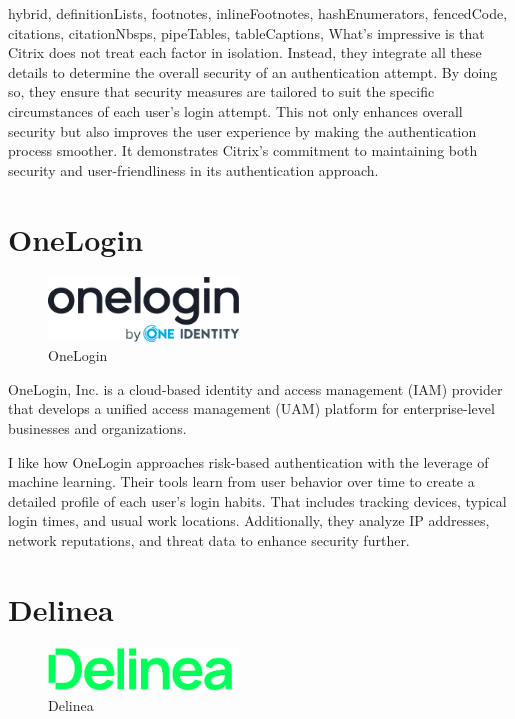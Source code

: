 \documentclass[
  digital,     %
  oneside,     %
  nosansbold,  %
  nocolorbold, %
  lof,         %
  lot,         %
]{fithesis4}
\begin{document}
\begin{markdown*}{%
  hybrid,
  definitionLists,
  footnotes,
  inlineFootnotes,
  hashEnumerators,
  fencedCode,
  citations,
  citationNbsps,
  pipeTables,
  tableCaptions,
}
What's impressive is that Citrix does not treat each factor in isolation.
Instead, they integrate all these details to determine the overall security of an authentication attempt.
By doing so, they ensure that security measures are tailored to suit the specific circumstances of each user's login attempt. This not only enhances overall security but also improves the user experience by making the authentication process smoother.
It demonstrates Citrix's commitment to maintaining both security and user-friendliness in its authentication approach.\cite{existing-citrix-wiki} \cite{existing-citrix-blog}


\newpage
\section{OneLogin}

\begin{figure}[htbp]
  \centering
  \includegraphics[width=0.45\textwidth]{img/onelogin.png}
  \caption{OneLogin}
  \label{fig:onelogin-logo}
\end{figure}

OneLogin, Inc. is a cloud-based identity and access management (IAM) provider that develops a unified access management (UAM) platform for enterprise-level businesses and organizations. \cite{existing-onelogin}

I like how OneLogin approaches risk-based authentication with the leverage of machine learning. 
Their tools learn from user behavior over time to create a detailed profile of each user's login habits.
That includes tracking devices, typical login times, and usual work locations.
Additionally, they analyze IP addresses, network reputations, and threat data to enhance security further.

\section{Delinea}

\begin{figure}[htbp]
  \centering
  \includegraphics[width=0.45\textwidth]{img/delinea.png}
  \caption{Delinea}
  \label{fig:delinea-logo}
\end{figure}


\end{markdown*}
\end{document}

